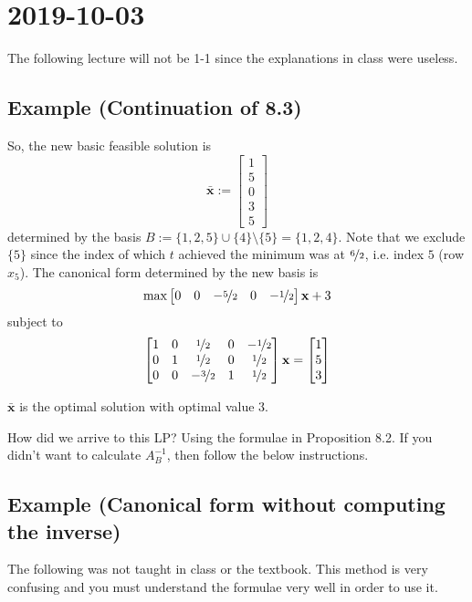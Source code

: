 \section{2019-10-03}
\begin{remark}
    The following lecture will not be 1-1 since the explanations in class were useless.
\end{remark}

\subsection{Example (Continuation of 8.3)}
So, the new basic feasible solution is
\[\mathbf{\bar{x}}:=
    \begin{bmatrix}
        1\\
        5\\
        0\\
        3\\
        5
    \end{bmatrix}
\]
determined by the basis $B:=\{1,2,5\}\cup\{4\}\setminus \{5\}=\{1,2,4\}$. Note that
we exclude $\{5\}$ since the index of which $t$ achieved the minimum was at
$\nicefrac{6}{2}$, i.e. index $5$ (row $x_5$). The canonical form determined by the new
basis is
\[\max \begin{bmatrix}
    0 & 0 & -\nicefrac{5}{2} & 0 & -\nicefrac{1}{2}
\end{bmatrix}\mathbf{x}+3\]
subject to
\[
    \begin{bmatrix}
        1 & 0 & \nicefrac{1}{2} & 0 & -\nicefrac{1}{2}\\
        0 & 1 & \nicefrac{1}{2} & 0 & \nicefrac{1}{2}\\
        0 & 0 & -\nicefrac{3}{2} & 1 & \nicefrac{1}{2}
    \end{bmatrix}\mathbf{x}
    =
    \begin{bmatrix}
        1\\
        5\\
        3
    \end{bmatrix}
\]
\begin{remark}
    $\mathbf{\bar{x}}$ is the optimal solution with optimal value $3$.
\end{remark}
\begin{remark}
    How did we arrive to this LP? Using the formulae in Proposition 8.2. If you didn't want to
    calculate $A_B^{-1}$, then follow the below instructions.
\end{remark}

\subsection{Example (Canonical form without computing the inverse)}
\begin{remark}
    The following was not taught in class or the textbook. 
    This method is very confusing and you must understand the formulae very 
    well in order to use it.
\end{remark}


